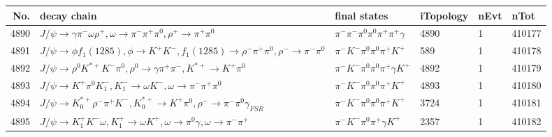\begin{table}[htbp] 
\begin{center}
\begin{small}
\begin{tabular}{rlllll}\hline\hline
 No. & decay chain & final states &  iTopology & nEvt & nTot \\\hline
4890&$J/\psi       \rightarrow \gamma       \pi^{-}        \omega         \rho^{+}      , \omega          \rightarrow \pi^{-}        \pi^{+}        \pi^{0}        , \rho^{+}       \rightarrow \pi^{+}        \pi^{0}        $&$\pi^{-}        \pi^{-}        \pi^{0}        \pi^{0}        \pi^{+}        \pi^{+}        \gamma       $& 4890&    1&410177\\
4891&$J/\psi       \rightarrow \phi           f_{1}(1285)    , \phi            \rightarrow K^{+}          K^{-}          , f_{1}(1285)     \rightarrow \rho^{-}      \pi^{+}        \pi^{0}        , \rho^{-}       \rightarrow \pi^{-}        \pi^{0}        $&$\pi^{-}        K^{-}          \pi^{0}        \pi^{0}        \pi^{+}        K^{+}          $&  589&    1&410178\\
4892&$J/\psi       \rightarrow \rho^{0}      K^{*+}         K^{-}          \pi^{0}        , \rho^{0}       \rightarrow \gamma       \pi^{+}        \pi^{-}        , K^{*+}          \rightarrow K^{+}          \pi^{0}        $&$\pi^{-}        K^{-}          \pi^{0}        \pi^{0}        \pi^{+}        \gamma       K^{+}          $& 4892&    1&410179\\
4893&$J/\psi       \rightarrow K^{+}          \pi^{0}        K_{1}^{-}      , K_{1}^{-}       \rightarrow \omega         K^{-}          , \omega          \rightarrow \pi^{-}        \pi^{+}        \pi^{0}        $&$\pi^{-}        K^{-}          \pi^{0}        \pi^{0}        \pi^{+}        K^{+}          $& 4893&    1&410180\\
4894&$J/\psi       \rightarrow K_{0}^{*+}     \rho^{-}      \pi^{+}        K^{-}          , K_{0}^{*+}      \rightarrow K^{+}          \pi^{0}        , \rho^{-}       \rightarrow \pi^{-}        \pi^{0}        \gamma_{FSR} $&$\pi^{-}        K^{-}          \pi^{0}        \pi^{0}        \pi^{+}        K^{+}          $& 3724&    1&410181\\
4895&$J/\psi       \rightarrow K_1^{+}        K^{-}          \omega         , K_1^{+}         \rightarrow \omega         K^{+}          , \omega          \rightarrow \pi^{0}        \gamma       , \omega          \rightarrow \pi^{-}        \pi^{+}        $&$\pi^{-}        K^{-}          \pi^{0}        \pi^{+}        \gamma       K^{+}          $& 2357&    1&410182\\

\end{tabular}
\end{small}
\end{center}
\end{table}
